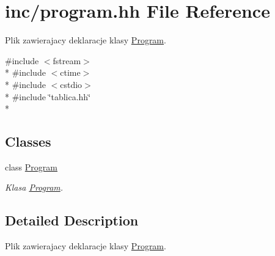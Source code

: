 \hypertarget{program_8hh}{\section{inc/program.hh File Reference}
\label{program_8hh}
}


Plik zawierajacy deklaracje klasy \hyperlink{class_program}{Program}.  


{\ttfamily \#include $<$fstream$>$}\\*
{\ttfamily \#include $<$ctime$>$}\\*
{\ttfamily \#include $<$cstdio$>$}\\*
{\ttfamily \#include \char`\"{}tablica.\-hh\char`\"{}}\\*
\subsection*{Classes}
\begin{DoxyCompactItemize}
\item 
class \hyperlink{class_program}{Program}
\begin{DoxyCompactList}\small\item\em Klasa \hyperlink{class_program}{Program}. \end{DoxyCompactList}\end{DoxyCompactItemize}


\subsection{Detailed Description}
Plik zawierajacy deklaracje klasy \hyperlink{class_program}{Program}. 